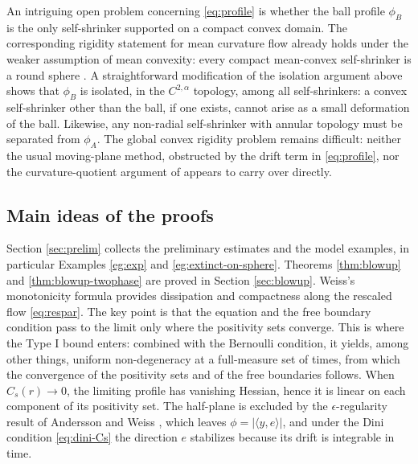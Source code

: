 \documentclass[11pt]{article}
\numberwithin{equation}{section}
\theoremstyle{definition}
\begin{document}
An intriguing open problem concerning \eqref{eq:profile} is whether the ball profile $\phi_B$ is the only self-shrinker supported on a compact convex domain. The corresponding rigidity statement for mean curvature flow already holds under the weaker assumption of mean convexity: every compact mean-convex self-shrinker is a round sphere \cite{Huisken}. A straightforward modification of the isolation argument above shows that $\phi_B$ is isolated, in the $C^{2,\alpha}$ topology, among all self-shrinkers: a convex self-shrinker other than the ball, if one exists, cannot arise as a small deformation of the ball. Likewise, any non-radial self-shrinker with annular topology must be separated from $\phi_A$. The global convex rigidity problem remains difficult: neither the usual moving-plane method, obstructed by the drift term in \eqref{eq:profile}, nor the curvature-quotient argument of \cite{Huisken} appears to carry over directly.


\subsection{Main ideas of the proofs}\label{ssec:main-ideas}

Section \ref{sec:prelim} collects the preliminary estimates and the model examples, in particular Examples \ref{eg:exp} and \ref{eg:extinct-on-sphere}. Theorems \ref{thm:blowup} and \ref{thm:blowup-twophase} are proved in Section \ref{sec:blowup}. Weiss's monotonicity formula \cite{Weiss} provides dissipation and compactness along the rescaled flow \eqref{eq:respar}. The key point is that the equation and the free boundary condition pass to the limit only where the positivity sets converge. This is where the Type I bound enters: combined with the Bernoulli condition, it yields, among other things, uniform non-degeneracy at a full-measure set of times,
from which the convergence of the positivity sets and of the free boundaries follows. When $C_s(r)\to0$, the limiting profile has vanishing Hessian, hence it is linear on each component of its positivity set. The half-plane is excluded by the $\epsilon$-regularity result of Andersson and Weiss \cite{AW}, which leaves $\phi=|\langle y,e\rangle|$, and under the Dini condition \eqref{eq:dini-Cs} the direction $e$ stabilizes because its drift is integrable in time.
\end{document}

